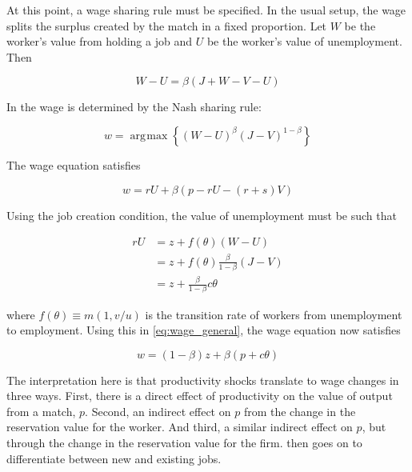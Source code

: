 \documentclass[11pt]{article}
\DeclareMathOperator*{\argmax}{arg\!\max}
\begin{document}
At this point, a wage sharing rule must be specified.
In the usual setup, the wage splits the surplus created by the match in a fixed proportion.
Let $W$ be the worker's value from holding a job and $U$ be the worker's value of unemployment.
Then

\begin{equation}
    W - U = \beta (J + W - V - U)
\end{equation}

In \cite{pissarides_2009} the wage is determined by the Nash sharing rule:

\begin{equation}
    w = \argmax \left\{ (W - U)^\beta (J - V)^{1 - \beta} \right\}
\end{equation}

The wage equation satisfies

\begin{equation} \label{eq:wage_general}
    w = r U + \beta (p - r U - (r + s) V)
\end{equation}

Using the job creation condition, the value of unemployment must be such that

\begin{align*}
    rU &= z + f(\theta)(W - U)\\
       &= z + f(\theta)\frac{\beta}{1 - \beta}(J - V)\\
       &=z + \frac{\beta}{1 - \beta}c \theta
\end{align*}

where $f(\theta) \equiv m(1, v/u)$ is the transition rate of workers from unemployment to employment.
Using this in \autoref{eq:wage_general}, the wage equation now satisfies

\begin{equation}
    w = (1 - \beta) z + \beta ( p + c \theta )
\end{equation}

The interpretation here is that productivity shocks translate to wage changes in three ways.
First, there is a direct effect of productivity on the value of output from a match, $p$.
Second, an indirect effect on $p$ from the change in the reservation value for the worker.
And third, a similar indirect effect on $p$, but through the change in the reservation value for the firm.
\cite{pissarides_2009} then goes on to differentiate between new and existing jobs.

\end{document}
